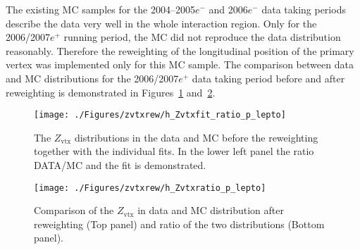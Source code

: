 The existing MC samples for the 2004--2005$e^-$ and 2006$e^-$ data taking periods describe the data very well in the whole interaction region. Only for the 2006/2007$e^+$ running period, the MC did not reproduce the data distribution reasonably. Therefore the reweighting of the longitudinal position of the primary vertex was implemented only for this MC sample. The comparison between data and MC distributions for the 2006/2007$e^+$ data taking period before and after reweighting is demonstrated in Figures~\ref{fig:zvtxrew} and~\ref{fig:zvtxrewaf}.
\begin{figure}[t]
\begin{center}
 \hspace{-35pt}\texttt{[image: ./Figures/zvtxrew/h\_Zvtxfit\_ratio\_p\_lepto]}%
\end{center}
\caption{The $Z_\text{vtx}$ distributions in the data and \lepto MC before the reweighting together with the individual fits. In the lower left panel the ratio DATA/MC and the fit is demonstrated.} 
\label{fig:zvtxrew}
\end{figure}

\begin{figure}[p]
\begin{center}
 \texttt{[image: ./Figures/zvtxrew/h\_Zvtxratio\_p\_lepto]}
\end{center}
\caption{Comparison of the $Z_\text{vtx}$ in data and \lepto MC distribution after reweighting (Top panel) and ratio of the two distributions (Bottom panel).} 
\label{fig:zvtxrewaf}
\end{figure}